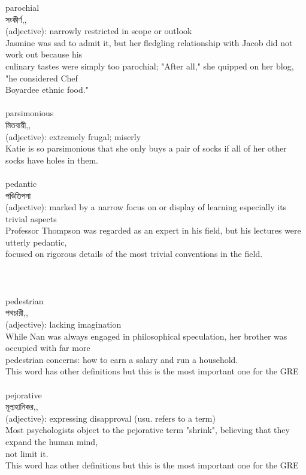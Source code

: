 \documentclass{article}
\begin{document}
{parochial}\\
{সংকীর্ণ,,}\\
{(adjective): narrowly restricted in scope or outlook\\Jasmine was sad to admit it, but her fledgling relationship with Jacob did not work out because his\\culinary tastes were simply too parochial; "After all," she quipped on her blog, "he considered Chef\\Boyardee ethnic food."\\}\\
{parsimonious}\\
{মিতব্যয়ী,,}\\
{(adjective): extremely frugal; miserly\\Katie is so parsimonious that she only buys a pair of socks if all of her other socks have holes in them.\\}\\
{pedantic}\\
{পণ্ডিতিপনা}\\
{(adjective): marked by a narrow focus on or display of learning especially its trivial aspects\\Professor Thompson was regarded as an expert in his field, but his lectures were utterly pedantic,\\focused on rigorous details of the most trivial conventions in the field.\\\\                                                                                 \\}\\
{pedestrian}\\
{পথচারী,,}\\
{(adjective): lacking imagination\\While Nan was always engaged in philosophical speculation, her brother was occupied with far more\\pedestrian concerns: how to earn a salary and run a household.\\This word has other definitions but this is the most important one for the GRE\\}\\
{pejorative}\\
{মূল্যহানিকর,,}\\
{(adjective): expressing disapproval (usu. refers to a term)\\Most psychologists object to the pejorative term "shrink", believing that they expand the human mind,\\not limit it.\\This word has other definitions but this is the most important one for the GRE\\}\\
\end{document}
